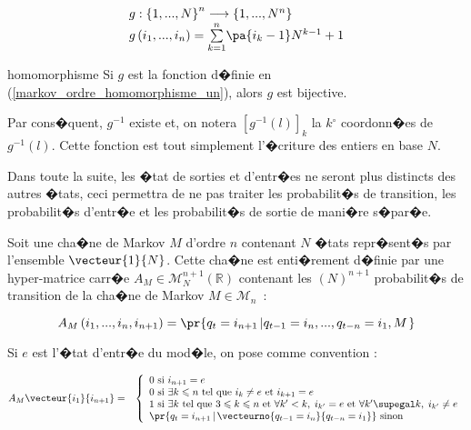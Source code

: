         \begin{eqnarray}
        \begin{array}{l}
        g:\left\{  1,...,N\right\}  ^{n}\longrightarrow\left\{  1,...,N^{n}\right\}\\
        g\left(  i_{1},...,i_{n}\right)  =\underset{k=1}{\overset{n}{\sum}}\pa{i_{k}-1}N^{k-1}+1
        \end{array}
        \label{markov_ordre_homomorphisme_un}
        \end{eqnarray}

        \begin{xproperty}{homomorphisme}
        \label{propriete_chaine_ordre_n_1}%
        Si $g$ est la fonction d�finie en (\ref{markov_ordre_homomorphisme_un}), alors $g$ est bijective.
        \end{xproperty}


Par cons�quent, $g^{-1}$ existe et, on notera $\left[g^{-1}\left(l\right)\right]  _{k}$ la $k{{}^\circ}$ coordonn�es de $g^{-1}\left(l\right)$. Cette fonction est tout simplement l'�criture des entiers en base $N$.

Dans toute la suite, les �tat de sorties et d'entr�es ne seront plus distincts des autres �tats, ceci permettra de ne pas traiter les probabilit�s de transition, les probabilit�s d'entr�e et les probabilit�s de sortie de mani�re s�par�e.


Soit une cha�ne de Markov $M$ d'ordre $n$ contenant $N$ �tats repr�sent�s par l'ensemble $\vecteur{1}{N}$. Cette cha�ne est enti�rement d�finie par une hyper-matrice carr�e $A_{M}\in\mathcal{M}_{N}^{n+1}\left(\mathbb{R}\right)  $ contenant les $\left( N\right)^{n+1}$ probabilit�s de transition de la cha�ne de Markov $M\in\mathcal{M}_{n}$~:

        $$
        A_{M}\left(i_{1},...,i_{n},i_{n+1}\right)  =\pr{  q_{t}=i_{n+1}\left| 
         q_{t-1}=i_{n},...,q_{t-n}=i_{1},M\right.  }
        $$

Si $e$ est l'�tat d'entr�e du mod�le, on pose comme convention :

        \begin{eqnarray}
        A_M \vecteur{i_1}{i_{n+1}} &=& \left \{
        \begin{array}{l}
        0 \text{ si } i_{n+1} = e \\
        0 \text{ si } \exists k \leqslant n \text{ tel que } i_k \neq e \text{ et } i_{k+1} = e \\
        1 \text{ si } \exists k \text{ tel que }  3 \leqslant k \leqslant n \text{ et } \forall k' < k, \; i_{k'} =
                 e \text { et } \forall k' \supegal k, \; i_{k'} \neq e \\
        \pr{q_t = i_{n+1} \, | \, \vecteurno{q_{t-1} = i_n}{q_{t-n} = i_1}} \text{ sinon}
        \end{array}
        \right. \label{hmm_equation_convention_ordre}
        \end{eqnarray}

